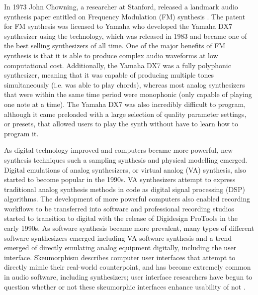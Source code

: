 In 1973 John Chowning, a researcher at Stanford, released a landmark audio synthesis paper entitled on Frequency Modulation (FM) synthesis \cite{chowning1973synthesis}. The patent for FM synthesis was licensed to Yamaha who developed the Yamaha DX7 synthesizer using the technology, which was released in 1983 and became one of the best selling synthesizers of all time. One of the major benefits of FM synthesis is that it is able to produce complex audio waveforms at low computational cost. Additionally, the Yamaha DX7 was a fully polyphonic synthesizer, meaning that it was capable of producing multiple tones simultaneously (i.e. was able to play chords), whereas most analog synthesizers that were within the same time period were monophonic (only capable of playing one note at a time). The Yamaha DX7 was also incredibly difficult to program, although it came preloaded with a large selection of quality parameter settings, or presets, that allowed users to play the synth without have to learn how to program it.

As digital technology improved and computers became more powerful, new synthesis techniques such a sampling synthesis \cite{mcguire2015musical} and physical modelling \cite{jaffe1983extensions} emerged. Digital emulations of analog synthesizers, or virtual analog (VA) synthesis, also started to become popular in the 1990s. VA synthesizers attempt to express traditional analog synthesis methods in code as digital signal processing (DSP) algorithms. The development of more powerful computers also enabled recording workflows to be transferred into software and professional recording studios started to transition to digital with the release of Digidesign ProTools in the early 1990s. As software synthesis became more prevalent, many types of different software synthesizers emerged including VA software synthesis and a trend emerged of directly emulating analog equipment digitally, including the user interface. Skeumorphism describes computer user interfaces that attempt to directly mimic their real-world counterpoint, and has become extremely common in audio software, including synthesizers; user interface researchers have begun to question whether or not these skeumorphic interfaces enhance usability of not \cite{lindh2018beyond}.

